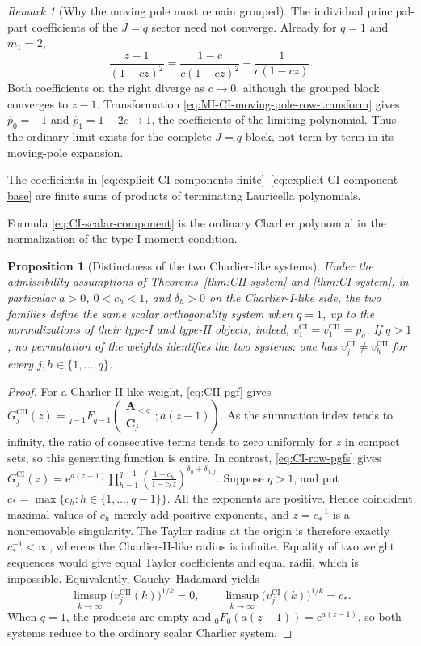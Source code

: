 \documentclass[10pt]{amsart}
\newcommand{\e}{\mathrm e}
\newcommand{\A}{\boldsymbol A}
\newcommand{\pFq}[5]{{}_{#1}F_{#2}\!\left(\begin{matrix}#3\\#4\end{matrix};#5\right)}
\theoremstyle{plain}
\newtheorem{proposition}[theorem]{Proposition}
\theoremstyle{definition}
\theoremstyle{remark}
\newtheorem{remark}[theorem]{Remark}
\begin{document}
\begin{remark}[Why the moving pole must remain grouped]
\label{rem:MI-CI-moving-pole-cancellation}
The individual principal-part coefficients of the \(J=q\) sector need
not converge. Already for \(q=1\) and \(m_1=2\),
\[
 \frac{z-1}{(1-cz)^2}
 =\frac{1-c}{c(1-cz)^2}-\frac1{c(1-cz)}.
\]
Both coefficients on the right diverge as \(c\to0\), although the
grouped block converges to \(z-1\). Transformation
\eqref{eq:MI-CI-moving-pole-row-transform} gives
\(\widehat p_0=-1\) and \(\widehat p_1=1-2c\to1\), the coefficients of
the limiting polynomial. Thus the ordinary limit exists for the complete
\(J=q\) block, not term by term in its moving-pole expansion.
\end{remark}

The coefficients in
\eqref{eq:explicit-CI-components-finite}--\eqref{eq:explicit-CI-component-base}
are finite sums of products of terminating Lauricella polynomials.

Formula \eqref{eq:CI-scalar-component} is the ordinary Charlier polynomial
in the normalization of the type-I moment condition.

\begin{proposition}[Distinctness of the two Charlier-like systems]
\label{prop:Charlier-families-distinct}
Under the admissibility assumptions of Theorems~\ref{thm:CII-system} and
\ref{thm:CI-system}, in particular \(a>0\), \(0<c_h<1\), and
\(\delta_h>0\) on the Charlier-I-like side, the two families define the
same scalar orthogonality system when \(q=1\), up to the normalizations of
their type-I and type-II objects; indeed,
\(v_1^{\mathrm{CI}}=v_1^{\mathrm{CII}}=p_a\). If \(q>1\), no permutation
of the weights identifies the two systems: one has
\(v_j^{\mathrm{CI}}\ne v_h^{\mathrm{CII}}\) for every
\(j,h\in\{1,\ldots,q\}\).
\end{proposition}

\begin{proof}
For a Charlier-II-like weight, \eqref{eq:CII-pgf} gives
\(G_j^{\mathrm{CII}}(z)
=\pFq{q-1}{q-1}{\A_{<q}}{\boldsymbol C_j}{a(z-1)}\).
As the summation index tends to infinity, the ratio of consecutive terms tends
to zero uniformly for \(z\) in
compact sets, so this generating function is entire.  In contrast,
\eqref{eq:CI-row-pgfs} gives
\(G_j^{\mathrm{CI}}(z)=\e^{a(z-1)}
\prod_{h=1}^{q-1}\left(\frac{1-c_h}{1-c_hz}\right)^{
\delta_h+\delta_{h,j}}\).
Suppose \(q>1\), and put
\(c_*=\max\{c_h:h\in\{1,\ldots,q-1\}\}\). All the exponents are
positive.  Hence coincident maximal values of \(c_h\) merely add positive
exponents, and \(z=c_*^{-1}\) is a nonremovable singularity.  The Taylor
radius at the origin is therefore exactly \(c_*^{-1}<\infty\), whereas the
Charlier-II-like radius is infinite.  Equality of two weight sequences
would give equal Taylor coefficients and equal radii, which is impossible.
Equivalently, Cauchy--Hadamard yields
\[
 \limsup_{k\to\infty}\bigl(v_j^{\mathrm{CII}}(k)\bigr)^{1/k}=0,
 \qquad
 \limsup_{k\to\infty}\bigl(v_j^{\mathrm{CI}}(k)\bigr)^{1/k}=c_*.
\]
When \(q=1\), the products are empty and
\({}_0F_0(a(z-1))=\e^{a(z-1)}\), so both systems reduce to the ordinary
scalar Charlier system.
\end{proof}
\end{document}
